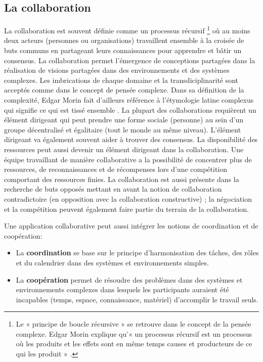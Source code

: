 \subsection{La collaboration}
La collaboration  est souvent 
définie comme un processus récursif
\footnote{Le « principe de boucle 
	récursive » se retrouve dans le concept de la pensée complexe. Edgar Morin  
	explique qu'« un processus récursif est un processus où les produits et les 
	effets 
	sont en même temps causes et producteurs de ce qui les produit » 
	\cite[p. 100]{Morin1990}.} où au moins deux acteurs (personnes ou organisations) 
travaillent ensemble à la croisée de buts communs 
en partageant leurs connaissances pour apprendre et bâtir un consensus. 
La collaboration permet l'émergence de conceptions partagées dans la réalisation 
de visions partagées dans des environnements et des systèmes complexes. 
Les imbrications de chaque domaine et la transdiciplinarité sont acceptés comme 
dans le concept de pensée complexe. Dans sa définition de la 
complexité, Edgar Morin fait d'ailleurs référence à l'étymologie latine \og 
complexus\fg{} qui signifie \og ce qui est tissé ensemble\fg{} \cite{Morin1990a}.
La plupart des collaborations requièrent un élément dirigeant qui peut prendre une 
forme sociale (personne) au sein d'un groupe décentralisé et égalitaire (tout le 
monde au même niveau). L'élément dirigeant va également souvent aider à trouver 
des consensus. 
La disponibilité des ressources peut aussi devenir un élément dirigeant dans 
la collaboration.
Une équipe travaillant de manière collaborative a la possibilité de concentrer plus de 
ressources, de reconnaissances et de récompenses lors d'une 
compétition comportant des ressources finies. 
La collaboration est aussi présente dans la recherche de buts opposés mettant en 
avant la notion de collaboration contradictoire (en opposition avec la collaboration 
constructive) ; la négociation et la compétition peuvent également faire partie du 
terrain 
de la collaboration.

Une application collaborative peut aussi intégrer les notions de coordination et de 
coopération:
\begin{itemize}
	\item La \textbf{coordination} se base sur le principe d'harmonisation des 
	tâches, des rôles et du calendrier dans des systèmes et environnements 
	simples.
	\item La \textbf{coopération} permet de résoudre des problèmes dans des 
	systèmes et environnements complexes dans lesquels les participants auraient 
	été 
	incapables (temps, espace, connaissance, matériel) d'accomplir le travail seuls.
\end{itemize}

